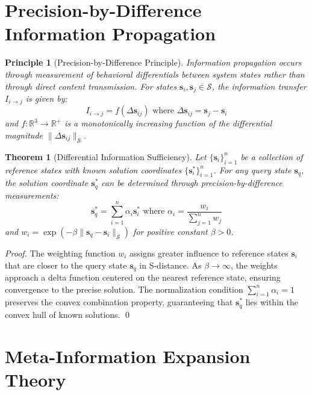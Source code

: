 \documentclass[12pt,a4paper]{article}
\newtheorem{theorem}{Theorem}
\newtheorem{principle}{Principle}
\begin{document}
\section{Precision-by-Difference Information Propagation}

\begin{principle}[Precision-by-Difference Principle]
\label{prin:precision_by_difference}
Information propagation occurs through measurement of behavioral differentials between system states rather than through direct content transmission. For states $\mathbf{s}_i, \mathbf{s}_j \in \mathcal{S}$, the information transfer $I_{i \to j}$ is given by:
\begin{equation}
I_{i \to j} = f(\Delta\mathbf{s}_{ij}) \text{ where } \Delta\mathbf{s}_{ij} = \mathbf{s}_j - \mathbf{s}_i
\end{equation}
and $f: \mathbb{R}^3 \to \mathbb{R}^+$ is a monotonically increasing function of the differential magnitude $\|\Delta\mathbf{s}_{ij}\|_{\mathcal{S}}$.
\end{principle}

\begin{theorem}[Differential Information Sufficiency]
\label{thm:differential_sufficiency}
Let $\{\mathbf{s}_i\}_{i=1}^n$ be a collection of reference states with known solution coordinates $\{\mathbf{s}_i^*\}_{i=1}^n$. For any query state $\mathbf{s}_q$, the solution coordinate $\mathbf{s}_q^*$ can be determined through precision-by-difference measurements:
\begin{equation}
\mathbf{s}_q^* = \sum_{i=1}^n \alpha_i \mathbf{s}_i^* \text{ where } \alpha_i = \frac{w_i}{\sum_{j=1}^n w_j}
\end{equation}
and $w_i = \exp(-\beta \|\mathbf{s}_q - \mathbf{s}_i\|_{\mathcal{S}})$ for positive constant $\beta > 0$.
\end{theorem}

\begin{proof}
The weighting function $w_i$ assigns greater influence to reference states $\mathbf{s}_i$ that are closer to the query state $\mathbf{s}_q$ in S-distance. As $\beta \to \infty$, the weights approach a delta function centered on the nearest reference state, ensuring convergence to the precise solution. The normalization condition $\sum_{i=1}^n \alpha_i = 1$ preserves the convex combination property, guaranteeing that $\mathbf{s}_q^*$ lies within the convex hull of known solutions. \qed
\end{proof}

\section{Meta-Information Expansion Theory}
\end{document}
